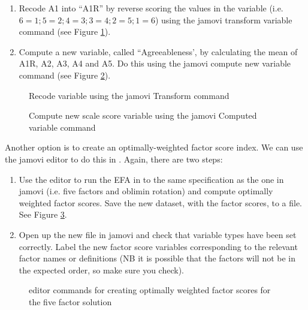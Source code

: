 \begin{enumerate} \itemsep -2pt
\item Recode A1 into “A1R” by reverse scoring the values in the variable (i.e. $6=1; 5=2; 4=3; 3=4; 2=5; 1=6$) using the jamovi transform variable command (see Figure \ref{fig:fa8}).
\item Compute a new variable, called “Agreeableness’,  by calculating the mean of A1R, A2, A3, A4 and A5. Do this using the jamovi compute new variable command (see Figure \ref{fig:fa9}).
\end{enumerate}

\begin{figure}[!htb]
\begin{center}
\caption{Recode variable using the jamovi Transform command}
\label{fig:fa8}
\HR
\end{center}
\end{figure}

\begin{figure}[!htb]
\begin{center}
\caption{Compute new scale score variable using the jamovi Computed variable command}
\label{fig:fa9}
\HR
\end{center}
\end{figure}

Another option is to create an optimally-weighted factor score index. We can use the jamovi  editor to do this in . Again, there are two steps:

\begin{enumerate} \itemsep -2pt
\item Use the  editor to run the EFA in  to the same specification as the one in jamovi (i.e. five factors and oblimin rotation) and compute optimally weighted factor scores. Save the new dataset, with the factor scores, to a file. See Figure \ref{fig:fa10}.
\item Open up the new file in jamovi and check that variable types have been set correctly. Label the new factor score variables corresponding to the relevant factor names or definitions (NB it is possible that the factors will not be in the expected order, so make sure you check).
\end{enumerate}

\begin{figure}[!htp]
\begin{center}
\caption{ editor commands for creating optimally weighted factor scores for the five factor solution}
\label{fig:fa10}
\HR
\end{center}
\end{figure}

